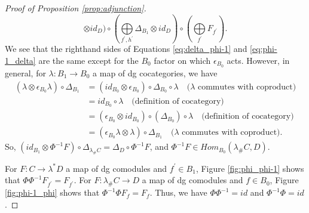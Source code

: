 \begin{proof}[Proof of Proposition \ref{prop:adjunction}]
\begin{equation}
  \otimes id_{D}) \circ
(\bigoplus \limits_{f^\prime, h^\prime}
  \Delta_{B_1} \otimes id_D) \circ  
(\bigoplus \limits_{f^\prime}
 F_{f^\prime}).
\end{equation}
We see that the righthand sides of 
Equations \ref{eq:delta_phi-1} and 
\ref{eq:phi-1_delta} are the same 
except for the $B_0$ factor on which 
$\epsilon_{B_0}$ acts. However, in general,
for $\lambda: B_1 \to B_0$ a map 
of dg cocategories, we have
\begin{align*}
(\lambda \otimes \epsilon_{B_0} \lambda)
  \circ \Delta_{B_1}
&=
(id_{B_0} \otimes \epsilon_{B_0}) \circ
  \Delta_{B_0} \circ \lambda
\quad \textrm{($\lambda$ commutes with coproduct)}\\
&= 
id_{B_0} \circ \lambda  
\quad \textrm{(definition of cocategory)}\\
&= 
(\epsilon_{B_0} \otimes id_{B_0}) \circ
  (\Delta_{B_0}) \circ \lambda
\quad \textrm{(definition of cocategory)}\\
&=
(\epsilon_{B_0} \lambda \otimes \lambda)
  \circ \Delta_{B_1}
\quad \textrm{($\lambda$ commutes with coproduct).}  
\end{align*}
So, $(id_{B_1}\otimes \Phi^{-1}F) \circ 
\Delta_{\lambda_\# C} = \Delta_D \circ \Phi^{-1}F$, 
and $\Phi^{-1}F \in Hom_{B_0}(\lambda_\#C, D)$.

For $F: C \to \lambda^*D$ a map of 
dg comodules and $f^\prime 
\in B_1$, Figure \ref{fig:phi_phi-1} 
shows that $\Phi\Phi^{-1}F_{f^\prime}
 = F_{f^\prime}$.
For $F: \lambda_\# C \to D$ a map of 
dg comodules and $f 
\in B_0$, Figure \ref{fig:phi-1_phi} 
shows that $\Phi^{-1}\Phi F_f= F_f$. 
Thus, we have $\Phi\Phi^{-1} = id$ 
and $\Phi^{-1}\Phi = id$.
\end{proof}
%
